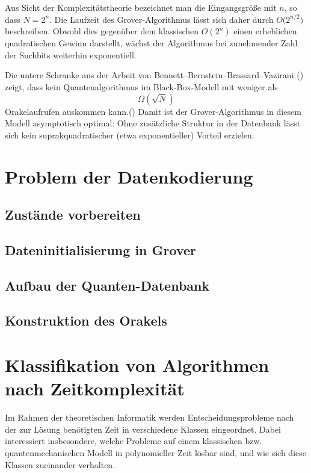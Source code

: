 Aus Sicht der Komplexitätstheorie bezeichnet man die Eingangsgröße mit \(n\), so dass $N = 2^n$.
Die Laufzeit des Grover‐Algorithmus lässt sich daher durch  
$O\bigl(2^{n/2}\bigr)$ beschreiben. Obwohl dies gegenüber dem klassischen \(O(2^n)\) einen erheblichen quadratischen Gewinn darstellt, wächst der Algorithmus bei zunehmender Zahl der Suchbits weiterhin exponentiell.

Die untere Schranke aus der Arbeit von Bennett–Bernstein–Brassard–Vazirani (\cite{zotero-1212}) zeigt, dass kein Quantenalgorithmus im Black‐Box‐Modell mit weniger als  
\[
\Omega(\sqrt{N})
\]  
Orakelaufrufen auskommen kann.(\cite{zotero-1211}) Damit ist der Grover‐Algorithmus in diesem Modell asymptotisch optimal: Ohne zusätzliche Struktur in der Datenbank lässt sich kein suprakquadratischer (etwa exponentieller) Vorteil erzielen.  

\section{Problem der Datenkodierung}
\subsection{Zustände vorbereiten}
\subsection{Dateninitialisierung in Grover}
\subsection{Aufbau der Quanten-Datenbank}
\subsection{Konstruktion des Orakels}

\section{Klassifikation von Algorithmen nach Zeitkomplexität}

Im Rahmen der theoretischen Informatik werden Entscheidungsprobleme nach der zur Lösung benötigten Zeit in verschiedene Klassen eingeordnet. Dabei interessiert insbesondere, welche Probleme auf einem klassischen bzw. quantenmechanischen Modell in polynomieller Zeit lösbar sind, und wie sich diese Klassen zueinander verhalten.\\

